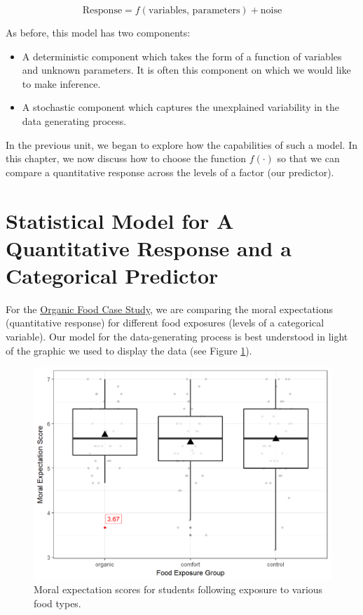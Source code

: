 \documentclass[]{book}
\providecommand{\tightlist}{%
  \setlength{\itemsep}{0pt}\setlength{\parskip}{0pt}}
\theoremstyle{plain}
\theoremstyle{mydefn}
\theoremstyle{myexmpl}
\theoremstyle{remark}
\begin{document}
\[\text{Response} = f(\text{variables, parameters}) + \text{noise}\]

As before, this model has two components:

\begin{itemize}
\tightlist
\item
  A deterministic component which takes the form of a function of
  variables and unknown parameters. It is often this component on which
  we would like to make inference.
\item
  A stochastic component which captures the unexplained variability in
  the data generating process.
\end{itemize}

In the previous unit, we began to explore how the capabilities of such a
model. In this chapter, we now discuss how to choose the function
\(f(\cdot)\) so that we can compare a quantitative response across the
levels of a factor (our predictor).

\section{Statistical Model for A Quantitative Response and a Categorical
Predictor}\label{statistical-model-for-a-quantitative-response-and-a-categorical-predictor}

For the \protect\hyperlink{CaseOrganic}{Organic Food Case Study}, we are
comparing the moral expectations (quantitative response) for different
food exposures (levels of a categorical variable). Our model for the
data-generating process is best understood in light of the graphic we
used to display the data (see Figure \ref{fig:anovamodel-organic-plot}).

\begin{figure}

{\centering \includegraphics[width=0.8\linewidth]{./Images/anovamodel-organic-plot-1} 

}

\caption{Moral expectation scores for students following exposure to various food types.}\label{fig:anovamodel-organic-plot}
\end{figure}
\end{document}
